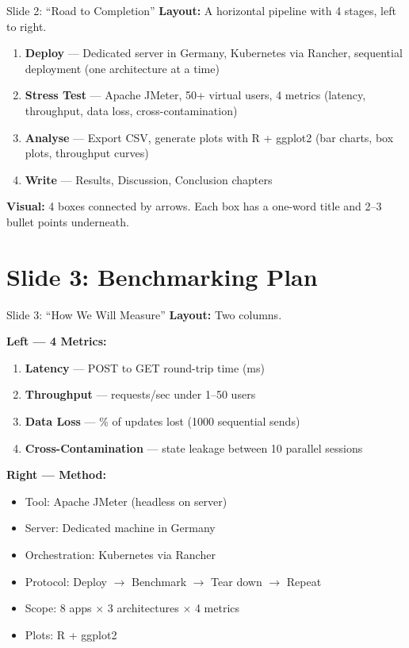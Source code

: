 \documentclass[12pt,a4paper]{article}
\begin{document}
\begin{slidebox}{Slide 2: ``Road to Completion''}
\textbf{Layout:} A horizontal pipeline with 4 stages, left to right.

\begin{enumerate}[nosep]
  \item \textbf{Deploy} --- Dedicated server in Germany, Kubernetes via Rancher, sequential deployment (one architecture at a time)
  \item \textbf{Stress Test} --- Apache JMeter, 50+ virtual users, 4 metrics (latency, throughput, data loss, cross-contamination)
  \item \textbf{Analyse} --- Export CSV, generate plots with R + ggplot2 (bar charts, box plots, throughput curves)
  \item \textbf{Write} --- Results, Discussion, Conclusion chapters
\end{enumerate}

\textbf{Visual:} 4 boxes connected by arrows. Each box has a one-word title and 2--3 bullet points underneath.
\end{slidebox}

\section{Slide 3: Benchmarking Plan}

\begin{slidebox}{Slide 3: ``How We Will Measure''}
\textbf{Layout:} Two columns.

\textbf{Left --- 4 Metrics:}
\begin{enumerate}[nosep]
  \item \textbf{Latency} --- POST to GET round-trip time (ms)
  \item \textbf{Throughput} --- requests/sec under 1--50 users
  \item \textbf{Data Loss} --- \% of updates lost (1000 sequential sends)
  \item \textbf{Cross-Contamination} --- state leakage between 10 parallel sessions
\end{enumerate}

\textbf{Right --- Method:}
\begin{itemize}[nosep]
  \item Tool: Apache JMeter (headless on server)
  \item Server: Dedicated machine in Germany
  \item Orchestration: Kubernetes via Rancher
  \item Protocol: Deploy $\rightarrow$ Benchmark $\rightarrow$ Tear down $\rightarrow$ Repeat
  \item Scope: 8 apps $\times$ 3 architectures $\times$ 4 metrics
  \item Plots: R + ggplot2
\end{itemize}
\end{slidebox}
\end{document}
